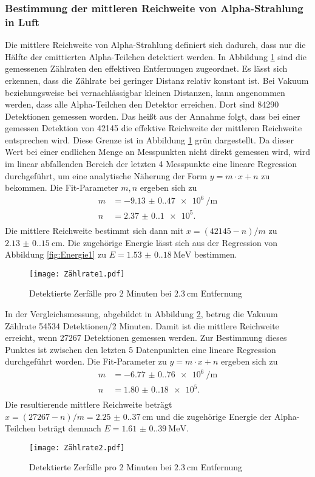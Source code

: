\subsubsection{Bestimmung der mittleren Reichweite von Alpha-Strahlung in Luft}
Die mittlere Reichweite von Alpha-Strahlung definiert sich dadurch, dass nur die Hälfte der emittierten Alpha-Teilchen
detektiert werden. In Abbildung \ref{fig:Rate1} sind die gemessenen Zählraten den effektiven Entfernungen
zugeordnet. Es lässt sich erkennen, dass die Zählrate bei geringer Distanz relativ konstant ist. Bei Vakuum beziehungsweise
bei vernachlässigbar kleinen Distanzen, kann angenommen werden, dass alle Alpha-Teilchen den Detektor erreichen.
Dort sind 84290 Detektionen gemessen worden. Das heißt aus der Annahme folgt, dass bei einer gemessen Detektion von 42145
die effektive Reichweite der mittleren Reichweite entsprechen wird. Diese Grenze ist in Abbildung \ref{fig:Rate1} grün dargestellt.
Da dieser Wert bei einer endlichen Menge an Messpunkten nicht direkt gemessen wird, wird im linear abfallenden Bereich der letzten 4 Messpunkte 
eine lineare Regression durchgeführt, um eine analytische Näherung der Form $y=m\cdot x+n$
zu bekommen. Die Fit-Parameter $m,n$ ergeben sich zu
\begin{align*}
  m&=\qty{-9.13(0.47)e6}{\per\meter}\\
  n&=\num{2.37(0.10)e5}.\\
\end{align*}
Die mittlere Reichweite bestimmt sich dann mit $x=(42145-n)/m$ zu $\qty{2.13(0.15)}{\centi\meter}$.
Die zugehörige Energie lässt sich aus der Regression von Abbildung \ref{fig:Energie1} zu $E=\qty{1.53(0.18)}{\mega\electronvolt}$ bestimmen.
\begin{figure}[H]
  \centering
  \texttt{[image: Zählrate1.pdf]}
  \caption{Detektierte Zerfälle pro 2 Minuten bei $\qty{2.3}{\centi\meter}$ Entfernung}
  \label{fig:Rate1}
\end{figure}
\noindent In der Vergleichsmessung, abgebildet in Abbildung \ref{fig:Rate2}, betrug die Vakuum Zählrate
54534 Detektionen/2 Minuten. Damit ist die mittlere Reichweite erreicht, wenn 27267 Detektionen 
gemessen werden. Zur Bestimmung dieses Punktes ist zwischen den letzten 5 Datenpunkten eine lineare
Regression durchgeführt worden. Die Fit-Parameter zu $y=m\cdot x+n$ ergeben sich zu
\begin{align*}
  m&=\qty{-6.77(0.76)e6}{\per\meter}\\
  n&=\num{1.80(0.18)e5}.\\
\end{align*}
Die resultierende mittlere Reichweite beträgt $x=(27267-n)/m=\qty{2.25(0.37)}{\centi\meter}$
und die zugehörige Energie der Alpha-Teilchen beträgt demnach $E=\qty{1.61(0.39)}{\mega\electronvolt}$.
\begin{figure}[H]
  \centering
  \texttt{[image: Zählrate2.pdf]}
  \caption{Detektierte Zerfälle pro 2 Minuten bei $\qty{2.3}{\centi\meter}$ Entfernung}
  \label{fig:Rate2}
\end{figure}

